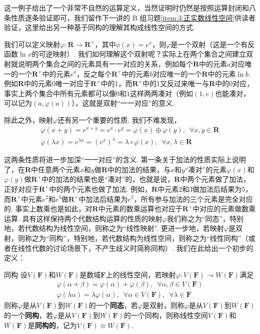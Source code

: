 这一例子给出了一个非常不自然的运算定义，当然证明时仍然是按照运算封闭和八条性质逐条验证即可，我们留作下一讲的 B 组习题\ref{item:3:正实数线性空间}供读者验证，这里给出另一种基于同构的理解其构成线性空间的方式.

我们可以定义映射$\varphi\colon\mathbf{R}\to\mathbf{R}^+$，其中$\phi(x)=e^x$，则$\varphi$是一个双射（这是一个有反函数$\ln x$的可逆映射）. 我们如何理解这个双射呢？实际上在两个集合之间建立双射就说明两个集合之间的元素具有一一对应的关系，例如每个$\mathbf{R}$中的元素$a$对应唯一的一个$\mathbf{R}^+$中的元素$e^a$，反之每个$\mathbf{R}^+$中的元素$b$对应唯一的一个$\mathbf{R}$中的元素$\ln b$. 例如$\mathbf{R}$中的元素$0$唯一对应于$\mathbf{R}^+$中的1，而$\mathbf{R}^+$中的1又反过来唯一与$\mathbf{R}$中的$0$对应，事实上两个集合中所有元素都可以像$0$和$1$这样两两凑对（例如$(1,e)$也能凑对，可以记为$(a,\varphi(a))$），这就是双射``一一对应''的意义.

除此之外，映射$\varphi$还有另一个重要的性质. 我们不难发现，
\begin{gather*}
    \varphi(x+y)=e^{x+y}=e^x\cdot e^y=\varphi(x)\oplus\varphi(y),\enspace\forall x,y\in\mathbf{R} \\
    \varphi(\lambda x)=e^{\lambda x}=(e^x)^\lambda=\lambda\circ\varphi(x),\enspace\forall x,\lambda\in\mathbf{R}
\end{gather*}

这两条性质将进一步加深``一一对应''的含义. 第一条关于加法的性质实际上说明了，在$\mathbf{R}$中任意两个元素$x$和$y$做$\mathbf{R}$中的加法的结果，与$x$和$y$``凑对''的元素$\varphi(x)$和$\varphi(y)$做$\mathbf{R}^+$中的加法的结果也是``凑对''的，也就是说，$\mathbf{R}$中两个元素做了加法，正好对应于$\mathbf{R}^+$中的两个元素也做了加法. 例如，$\mathbf{R}$中元素$2$和$3$做加法后结果为$5$，而$\mathbf{R}^+$中元素$e^2$和$e^3$做$\mathbf{R}^+$中加法后结果为$e^5$，所有参与加法的三个元素是完全对应的. 事实上数乘也是如此，对$\mathbf{R}$中元素的数乘运算也对应于$\mathbf{R}^+$中对应的元素做数乘运算. 具有这样保持两个代数结构运算的性质的映射$\varphi$我们称之为``同态''，特别地，若代数结构为线性空间，则称之为``线性映射''. 更进一步地，若映射$\varphi$是双射，则称之为``同构''，特别地，若代数结构为线性空间，则称之为``线性同构''（或者在线性代数的讨论场景下，不产生歧义时简称同构）. 我们在此给出一个初步的定义：
\begin{definition}{}{同构}
    设$V(\mathbf{F})$和$W(\mathbf{F})$是数域$\mathbf{F}$上的线性空间，若映射$\varphi\colon V(\mathbf{F})\to W(\mathbf{F})$满足
    \begin{gather*}
        \varphi(\alpha+\beta)=\varphi(\alpha)+\varphi(\beta),\enspace\forall\alpha,\beta\in V(\mathbf{F}) \\
        \varphi(\lambda\alpha)=\lambda\varphi(\alpha),\enspace\forall\alpha\in V(\mathbf{F}),\enspace\forall\lambda\in\mathbf{F}
    \end{gather*}
    则称$\varphi$是从$V(\mathbf{F})$到$W(\mathbf{F})$的一个\textbf{同态}，若$\varphi$是双射，则称$\varphi$是从$V(\mathbf{F})$到$W(\mathbf{F})$的一个\textbf{同构}，若$\varphi$是从$V(\mathbf{F})$到$W(\mathbf{F})$的一个同构，则称线性空间$V(\mathbf{F})$和$W(\mathbf{F})$是\textbf{同构的}，记为$V(\mathbf{F})\cong W(\mathbf{F})$.
\end{definition}

